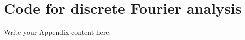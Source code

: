 
\chapter{Code for discrete Fourier analysis} %

\label{codefft} %


Write your Appendix content here.
\cite{Light1}
\cite{Light2}
\cite{curle}
\cite{FWH}
\cite{bladecompose}
\cite{r67design}
\cite{r67performance}
\cite{r67laser}

